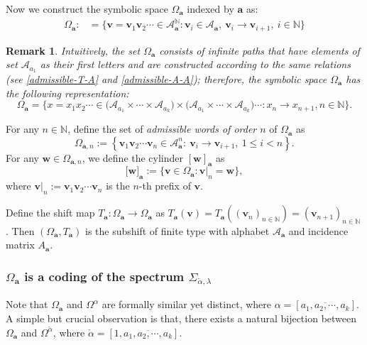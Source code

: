 \documentclass[reqno,11pt,graphicx,]{amsart}
\numberwithin{equation}{section}
\theoremstyle{plain}
\newcommand{\N}{{\mathbb N}}
\newcommand{\3}{\mathbf{3}}
\newcommand{\ma}{\mathbf{a}}
\newcommand{\mv}{\mathbf{v}}
\newtheorem{remark}[theorem]{Remark}
\begin{document}
	Now we construct the symbolic space $\Omega _{\mathbf{a}}$ indexed by $\ma$ as: 
	\begin{align*}
		\Omega _{\mathbf{a}}:&=\Big\{\mathbf{v}=\mathbf{v}_{1}\mathbf{v}_{2}\cdots \in 
		{\mathcal A}_{\mathbf{a}}^{{\mathbb{N}}}:\mathbf{v}_{i}\in \mathcal{A}_{\mathbf{a}},\  \mathbf{v}_{i}\rightarrow \mathbf{v}%
		_{i+1},\ i\in\N\Big\}
	\end{align*}
	\begin{remark}\label{a-Omega-a}
		Intuitively, the set $\Omega_{\ma}$ consists of infinite paths that have elements of set $\mathscr{A}_{a_1}$ as their first letters and are constructed according to the same relations (see \eqref{admissible-T-A} and \eqref{admissible-A-A}); therefore, the symbolic space $\Omega_{\ma}$ has the following representation:
		\begin{equation*}
			\Omega_{\ma}=\Big\{x=x_1x_2\cdots \in\Big({\mathscr A}_{a_1}\times\cdots\times{\mathscr A}_{a_k}\Big)\times\Big({\mathscr A}_{a_1}
			\times\cdots\times{\mathscr A}_{a_k}\Big)\cdots: x_n\to x_{n+1}, n\in\N \Big\}.
		\end{equation*}
	\end{remark}
	
	For any $n\in {\mathbb{N}}$, define the set of \textit{admissible words of
		order $n$} of $\Omega _{\mathbf{a}}$ as 
	\begin{equation*}
		\Omega _{\mathbf{a},n}:=\left\{\mathbf{v}_{1}\mathbf{v}
		_{2}\cdots \mathbf{v}_{n}\in {\mathcal A}_{\mathbf{a}}^n:\  \mathbf{v}_{i}\rightarrow \mathbf{v}%
		_{i+1},\ 1\leq i< n \right\}. 
	\end{equation*}%
	For any $\mathbf{w}\in \Omega _{\mathbf{a},n}$, we define the cylinder $[\mathbf{w}]_{\ma}$ as
	\begin{equation}\label{cylinder-a}
		\lbrack \mathbf{w}]_{\mathbf{a}}:=\{\mv\in \Omega _{\mathbf{a}}:\mv|_{n}=\mathbf{w}\},
	\end{equation}
	where $\mv|_{n}:=\mathbf{v}_{1}\mathbf{v}_{2}\cdots \mathbf{v}_{n}$ is the $n$-th prefix of $\mv$.
	
	Define the shift map $T_{\ma}:\Omega_{\ma}\to\Omega_{\ma}$ as $T_{\ma}(\mv)=T_{\ma}((\mv_n)_{n\in\N})=(\mv_{n+1})_{n\in\N}$.
	Then $(\Omega_{\ma},T_{\ma})$ is the subshift of finite type with alphabet $\mathcal{A}_{\mathbf{a}}$ and incidence matrix  $A_{\mathbf{a}}$. 
	\subsubsection{$\Omega_{\ma}$ is a coding of the spectrum $\Sigma_{\check{\alpha},\lambda}$}
	Note that $\Omega_{\ma}$ and $\Omega^{\alpha}$ are formally similar yet distinct, where $\alpha=[\overline{a_1,a_2,\cdots,a_k}]$. A simple but crucial observation is that, there exists a natural bijection between $\Omega_{\ma}$ and $\Omega^{\check{\alpha}}$, where $\check{\alpha}=[1,\overline{a_1,a_2,\cdots,a_k}]$. 
	
\end{document}
